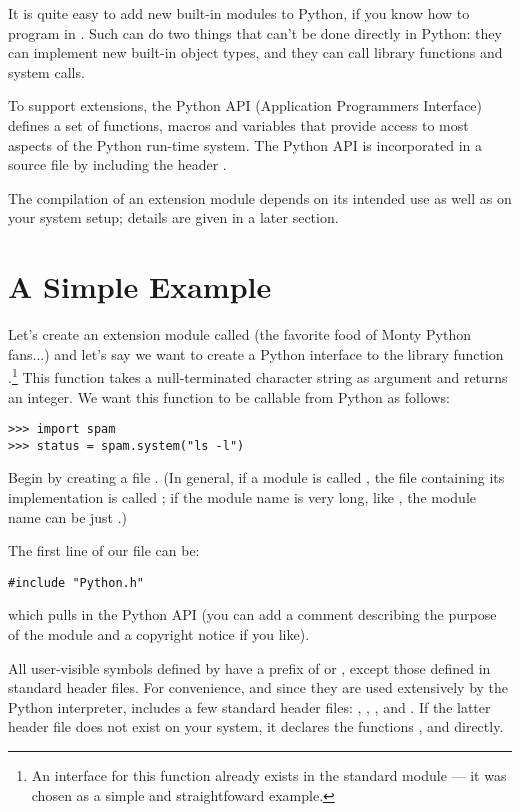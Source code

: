 \documentclass{manual}
\begin{document}
It is quite easy to add new built-in modules to Python, if you know
how to program in \C{}.  Such  can do two things
that can't be done directly in Python: they can implement new built-in
object types, and they can call \C{} library functions and system calls.

To support extensions, the Python API (Application Programmers
Interface) defines a set of functions, macros and variables that
provide access to most aspects of the Python run-time system.  The
Python API is incorporated in a \C{} source file by including the header
.

The compilation of an extension module depends on its intended use as
well as on your system setup; details are given in a later section.


\section{A Simple Example}
\label{simpleExample}

Let's create an extension module called  (the favorite food
of Monty Python fans...) and let's say we want to create a Python
interface to the \C{} library function .\footnote{An
interface for this function already exists in the standard module
 --- it was chosen as a simple and straightfoward example.}
This function takes a null-terminated character string as argument and
returns an integer.  We want this function to be callable from Python
as follows:

\begin{verbatim}
>>> import spam
>>> status = spam.system("ls -l")
\end{verbatim}

Begin by creating a file .  (In general, if a
module is called , the \C{} file containing its implementation
is called ; if the module name is very long, like
, the module name can be just .)

The first line of our file can be:

\begin{verbatim}
#include "Python.h"
\end{verbatim}

which pulls in the Python API (you can add a comment describing the
purpose of the module and a copyright notice if you like).

All user-visible symbols defined by  have a prefix of
 or , except those defined in standard header files.
For convenience, and since they are used extensively by the Python
interpreter,  includes a few standard header files:
, , , and
.  If the latter header file does not exist on your
system, it declares the functions ,
 and  directly.
\end{document}
